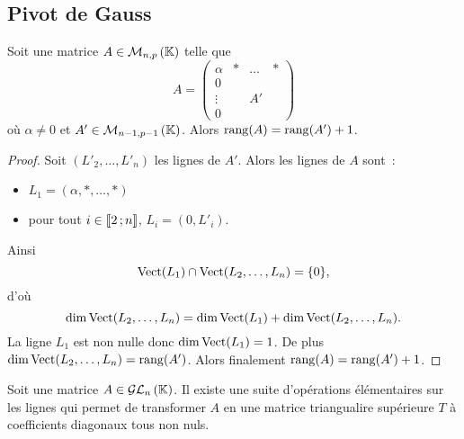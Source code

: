 \subsection{Pivot de Gauss}
%
\begin{lemme}
  Soit une matrice \(A \in \mathcal{M}_{n,p}\left(\mathbb{K}\right)\) telle que
  \begin{equation}
    A =
    \begin{pmatrix}
      \alpha & * & \ldots & * \\
      0 & & & \\
      \vdots & & A' & \\
      0 & & & 
    \end{pmatrix}
  \end{equation}
  où \(\alpha \neq 0\) et \(A'\in \mathcal{M}_{n-1,p-1}\left(\mathbb{K}\right)\). Alors \(\operatorname{rang}(A) = \operatorname{rang}(A')+1\).
\end{lemme}
\begin{proof}
  Soit \((L'_2, \ldots, L'_n)\) les lignes de \(A'\). Alors les lignes de \(A\) sont~:
  \begin{itemize}
  \item \(L_1 = (\alpha, *, \ldots, *)\)
  \item pour tout \(i \in \mathopen{\llbracket}2\mathclose{}\mathpunct{};n\mathclose{\rrbracket}\), \(L_i = (0,L'_i)\).
  \end{itemize}
  Ainsi
  \begin{equation}
    \operatorname{Vect}(L_1) \cap \operatorname{Vect}(L_2, \ldots, L_n) = \{0\},
  \end{equation}
  d'où
  \begin{equation}
    \dim \operatorname{Vect}(L_2, \ldots, L_n) = \dim \operatorname{Vect}(L_1) + \dim \operatorname{Vect}(L_2, \ldots, L_n).
  \end{equation}
  La ligne \(L_1\) est non nulle donc \(\dim \operatorname{Vect}(L_1) = 1\). De plus \(\dim \operatorname{Vect}(L_2, \ldots, L_n) = \operatorname{rang}(A')\). Alors finalement \(\operatorname{rang}(A) = \operatorname{rang}(A')+1\).
\end{proof}
%
\begin{prop}
  Soit une matrice \(A \in \mathcal{GL}_{n}\left(\mathbb{K}\right)\). Il existe une suite d'opérations élémentaires sur les lignes qui permet de transformer \(A\) en une matrice triangualire supérieure \(T\) à coefficients diagonaux tous non nuls.
\end{prop}
